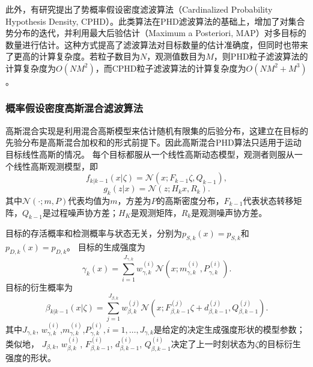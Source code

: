 此外，有研究提出了势概率假设密度滤波算法\cite{mahler2007phd}（Cardinalized Probability Hypothesis Density, CPHD）。此类算法在PHD滤波算法的基础上，增加了对集合势分布的迭代，并利用最大后验估计（Maximum a Posteriori, MAP）对多目标的数量进行估计。这种方式提高了滤波算法对目标数量的估计准确度，但同时也带来了更高的计算复杂度。若粒子数目为$N$，观测值数目为$M$，则PHD粒子滤波算法的计算复杂度为$O(NM^2)$，而CPHD粒子滤波算法的计算复杂度为$O(NM^2 + M^3)$\cite{nannuru2013computationally}。

\subsubsection{概率假设密度高斯混合滤波算法}

高斯混合实现是利用混合高斯模型来估计随机有限集的后验分布，这建立在目标的先验分布是高斯混合加权和的形式前提下。因此高斯混合PHD算法只适用于运动目标线性高斯的情况。
每个目标都服从一个线性高斯动态模型，观测者则服从一个线性高斯观测模型，即
\begin{equation}
f_{k|k-1}(x|\zeta) = \mathcal N(x;F_{k-1}\zeta,Q_{k-1}),
\end{equation}
\begin{equation}
g_k(z|x) = \mathcal N(z;H_kx,R_k).
\end{equation}
其中$\mathcal N(\cdot;m,P)$代表均值为$m$，方差为$P$的高斯密度分布，$F_{k-1}$代表状态转移矩阵，$Q_{k-1}$是过程噪声协方差；$H_K$是观测矩阵，$R_k$是观测噪声协方差。

目标的存活概率和检测概率与状态无关，分别为$p_{S,k}(x) = p_{S,k}$和$p_{D,k}(x) = p_{D,k}$。
目标的生成强度为
\begin{equation}
\gamma_k(x) = \sum_{i=1}^{J_{\gamma,k}}w_{\gamma,k}^{(i)}\mathcal N(x;m_{\gamma,k}^{(i)},P_{\gamma,k}^{(i)}).
\end{equation}
目标的衍生概率为
\begin{equation}
\beta_{k|k-1}(x|\zeta) = \sum_{j=1}^{J_{\beta,k}}w_{\beta,k}^{(j)}\mathcal N(x; F_{\beta,k-1}^{(j)}\zeta+d_{\beta,k-1}^{(j)},Q_{\beta,k-1}^{(j)}).
\end{equation}
其中$J_{\gamma,k}$, $w_{\gamma,k}^{(i)}$,$m_{\gamma,k}^{(i)}$,$P_{\gamma,k}^{(i)},i = 1,\dots,J_{\gamma,k}$是给定的决定生成强度形状的模型参数；类似地，
$J_{\beta,k}$, $w_{\beta,k}^{(i)}$, $F_{\beta,k-1}^{(i)}$, $d_{\beta,k-1}^{(i)}$, $Q_{\beta,k-1}^{(i)}$决定了上一时刻状态为$\zeta$的目标衍生强度的形状。

